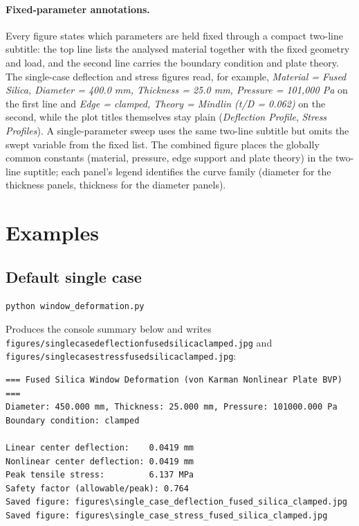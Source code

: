 \documentclass[11pt]{article}
\newcommand{\codeus}{\textunderscore\allowbreak}
\DeclareRobustCommand{\code}[1]{\texttt{\ifmmode\else\renewcommand{\_}{\codeus}\fi#1}}
\begin{document}
\paragraph{Fixed-parameter annotations.} Every figure states which parameters are
held fixed through a compact two-line subtitle: the top line lists the analysed
material together with the fixed geometry and load, and the second line carries the
boundary condition and plate theory. The single-case deflection and stress figures
read, for example, \emph{Material = Fused Silica, Diameter = 400.0 mm,
Thickness = 25.0 mm, Pressure = 101,000 Pa} on the first line and
\emph{Edge = clamped, Theory = Mindlin (t/D = 0.062)} on the second, while the
plot titles themselves stay plain (\emph{Deflection Profile}, \emph{Stress
Profiles}). A single-parameter sweep uses the same two-line subtitle but omits the
swept variable from the fixed list. The combined figure places the globally common
constants (material, pressure, edge support and plate theory) in the two-line
suptitle; each panel's legend identifies the curve family (diameter for the
thickness panels, thickness for the diameter panels).

\section{Examples}

\subsection{Default single case}

\begin{lstlisting}[style=shellstyle]
python window_deformation.py
\end{lstlisting}

\noindent Produces the console summary below and writes
\code{figures/single\_case\_deflection\_fused\_silica\_clamped.jpg} and
\code{figures/single\_case\_stress\_fused\_silica\_clamped.jpg}:

\begin{lstlisting}[style=shellstyle]
=== Fused Silica Window Deformation (von Karman Nonlinear Plate BVP) ===
Diameter: 450.000 mm, Thickness: 25.000 mm, Pressure: 101000.000 Pa
Boundary condition: clamped

Linear center deflection:    0.0419 mm
Nonlinear center deflection: 0.0419 mm
Peak tensile stress:         6.137 MPa
Safety factor (allowable/peak): 0.764
Saved figure: figures\single_case_deflection_fused_silica_clamped.jpg
Saved figure: figures\single_case_stress_fused_silica_clamped.jpg
\end{lstlisting}
\end{document}
